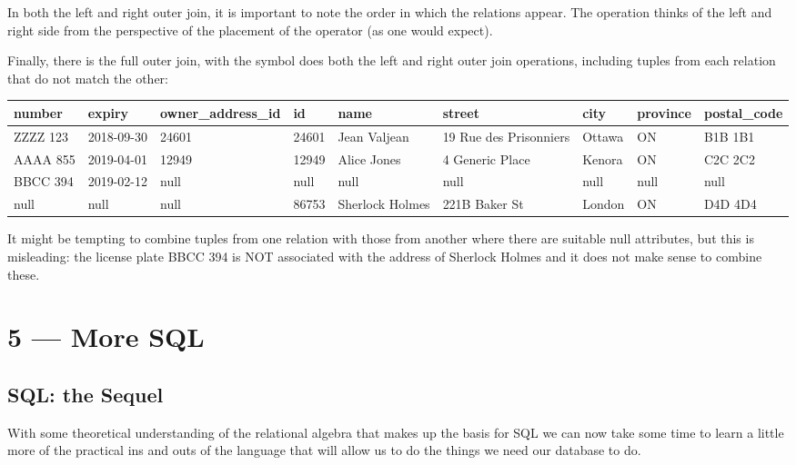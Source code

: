 \documentclass[a4paper]{report}
\begin{document}
In both the left and right outer join, it is important to note the order in which the relations appear. The operation thinks of the left and right side from the perspective of the placement of the operator (as one would expect).

Finally, there is the full outer join, with the symbol {\tiny {}} does both the left and right outer join operations, including tuples from each relation that do not match the other: 

{\scriptsize
\begin{center}
	\begin{tabular}{|l|l|l|l|l|l|l|l|l|}\hline
		\textbf{number} & \textbf{expiry} & \textbf{owner\_address\_id} & \textbf{id} & \textbf{name} &\textbf{street} & \textbf{city} & \textbf{province} & \textbf{postal\_code} \\ \hline
		ZZZZ 123 & 2018-09-30 & 24601 & 24601 & Jean Valjean & 19 Rue des Prisonniers & Ottawa & ON & B1B 1B1\\ \hline
		AAAA 855 & 2019-04-01 & 12949 & 12949 & Alice Jones & 4 Generic Place & Kenora & ON & C2C 2C2\\ \hline
		BBCC 394 & 2019-02-12 & null & null & null & null & null & null & null \\ \hline
		null & null & null & 86753 & Sherlock Holmes & 221B Baker St & London & ON & D4D 4D4 \\ \hline
	\end{tabular}
\end{center}
}

It might be tempting to combine tuples from one relation with those from another where there are suitable null attributes, but this is misleading: the license plate BBCC 394 is NOT associated with the address of Sherlock Holmes and it does not make sense to combine these.









\chapter*{5 --- More SQL}


\section*{SQL: the Sequel}
With some theoretical understanding of the relational algebra that makes up the basis for SQL we can now take some time to learn a little more of the practical ins and outs of the language that will allow us to do the things we need our database to do. 
\end{document}
